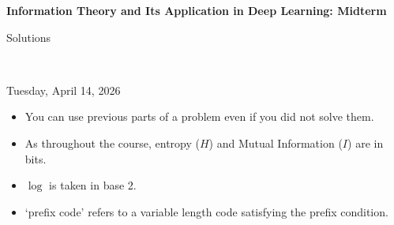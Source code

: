 \documentclass[12pt]{article}
\begin{document}
\begin{center}
{\bf Information Theory and Its Application in Deep Learning: Midterm \begin{solution}Solutions\end{solution}} \\ \medskip
\begin{problem}Tuesday, April 14, 2026 \end{problem}
\end{center}

\begin{problem}
\noindent 
\begin{itemize}
\item You can use previous parts of a problem even if you did not solve them.
\item As throughout the course, entropy ($H$) and Mutual Information ($I$) are in bits.
\item $\log$ is taken in base 2. 
\item `prefix code' refers to a variable length code satisfying the prefix condition.  
\end{itemize}
\end{problem}

\begin{solution}
\end{solution}

\end{document}
